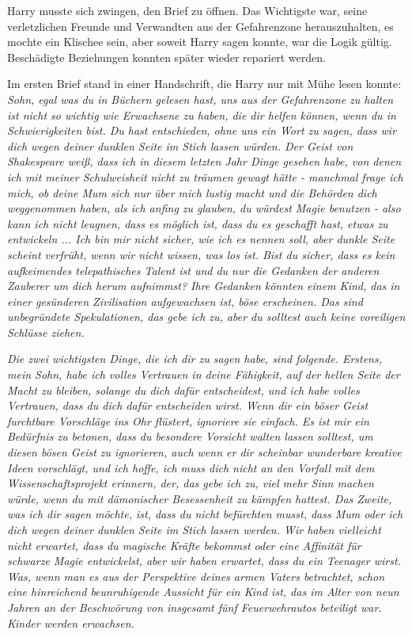 Harry musste sich zwingen, den Brief zu öffnen. Das Wichtigste war, seine
verletzlichen Freunde und Verwandten aus der Gefahrenzone herauszuhalten, es
mochte ein Klischee sein, aber soweit Harry sagen konnte, war die Logik gültig.
Beschädigte Beziehungen konnten später wieder repariert werden.

Im ersten Brief stand in einer Handschrift, die Harry nur mit Mühe lesen konnte:
\emph{Sohn, egal was du in Büchern gelesen hast, uns aus der Gefahrenzone zu
halten ist nicht so wichtig wie Erwachsene zu haben, die dir helfen können, wenn
du in Schwierigkeiten bist. Du hast entschieden, ohne uns ein Wort zu sagen,
dass wir dich wegen deiner \glqq{}dunklen Seite\grqq{} im Stich lassen würden.
Der Geist von Shakespeare weiß, dass ich in diesem letzten Jahr Dinge gesehen
habe, von denen ich mit meiner Schulweisheit nicht zu träumen gewagt hätte -
manchmal frage ich mich, ob deine Mum sich nur über mich lustig macht und die
Behörden dich weggenommen haben, als ich anfing zu glauben, du würdest Magie
benutzen - also kann ich nicht leugnen, dass es möglich ist, dass du es
geschafft hast, etwas zu entwickeln ... Ich bin mir nicht sicher, wie ich es
nennen soll, aber \glqq{}dunkle Seite\grqq{} scheint verfrüht, wenn wir nicht
wissen, was los ist. Bist du sicher, dass es kein aufkeimendes telepathisches
Talent ist und du nur die Gedanken der anderen Zauberer um dich herum aufnimmst?
Ihre Gedanken könnten einem Kind, das in einer gesünderen Zivilisation
aufgewachsen ist, böse erscheinen. Das sind unbegründete Spekulationen, das gebe
ich zu, aber du solltest auch keine voreiligen Schlüsse ziehen.}

\emph{Die zwei wichtigsten Dinge, die ich dir zu sagen habe, sind folgende.
Erstens, mein Sohn, habe ich volles Vertrauen in deine Fähigkeit, auf der hellen
Seite der Macht zu bleiben, solange du dich dafür entscheidest, und ich habe
volles Vertrauen, dass du dich dafür entscheiden wirst. Wenn dir ein böser Geist
furchtbare Vorschläge ins Ohr flüstert, ignoriere sie einfach. Es ist mir ein
Bedürfnis zu betonen, dass du besondere Vorsicht walten lassen solltest, um
diesen bösen Geist zu ignorieren, auch wenn er dir scheinbar wunderbare kreative
Ideen vorschlägt, und ich hoffe, ich muss dich nicht an den Vorfall mit dem
Wissenschaftsprojekt erinnern, der, das gebe ich zu, viel mehr Sinn machen
würde, wenn du mit dämonischer Besessenheit zu kämpfen hattest. Das Zweite, was
ich dir sagen möchte, ist, dass du nicht befürchten musst, dass Mum oder ich
dich wegen deiner \glqq{}dunklen Seite\grqq{} im Stich lassen werden. Wir haben
vielleicht nicht erwartet, dass du magische Kräfte bekommst oder eine Affinität
für schwarze Magie entwickelst, aber wir haben erwartet, dass du ein Teenager
wirst. Was, wenn man es aus der Perspektive deines armen Vaters betrachtet,
schon eine hinreichend beunruhigende Aussicht für ein Kind ist, das im Alter von
neun Jahren an der Beschwörung von insgesamt fünf Feuerwehrautos beteiligt war.
}
\emph{Kinder werden erwachsen.}

